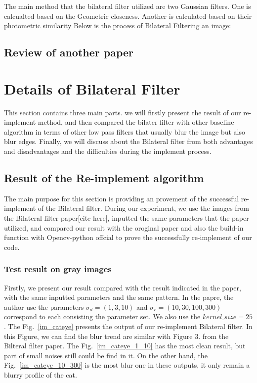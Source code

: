 \documentclass[12pt]{article}
\begin{document}
The main method that the bilateral filter utilized are two Gaussian filters. 
One is calcualted based on the Geometric closeness. 
Another is calculated based on their photometric similarity
Below is the process of Bilateral Filtering an image:




\subsection{Review of another paper}


\section{Details of Bilateral Filter}
\label{section Bilateral_filter}
This section contains three main parts. we will firstly present the result of our re-implement method, and then compared the bilater filter with other baseline algorithm in terms of other low pass filters that usually blur the image but also blur edges. 
Finally, we will discuss about the Bilateral filter from both advantages and disadvantages and the difficulties during the implement process.


\subsection{Result of the Re-implement algorithm}
\label{section reimplement}
The main purpose for this section is providing an provement of the successful re-implement of the Bilateral filter.
During our experiment, we use the images from the Bilateral filter paper[cite here], inputted the same parameters that the paper utilized, and compared our result with the oroginal paper and also the build-in function with Opencv-python offcial to prove the successfully re-implement of our code.

\subsubsection{Test result on gray images}
\label{subsection test gray}
Firstly, we present our result compared with the result indicated in the paper, with the same inputted parameters and the same pattern.
In the papre, the author use the parameters $\sigma_d = (1, 3, 10)$ and $\sigma_r = (10, 30, 100, 300)$ correspond to each consisting the parameter set.  
We also use the $kernel\_size = 25$.
The Fig.~\ref{im_cateye} presents the output of our re-implement Bilateral filter.
In this Figure, we can find the blur trend are similar with Figure 3. from the Bilteral filter paper.
The Fig.~\ref{im_cateye_1_10} has the most clean result, but part of small noises still could be find in it. 
On the other hand, the Fig.~\ref{im_cateye_10_300} is the most blur one in these outputs, it only remain a blurry profile of the cat. 
\end{document}
